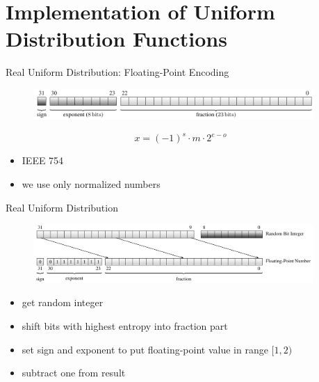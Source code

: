 \documentclass[aspectratio=169]{beamer}
\begin{document}
    \section{Implementation of Uniform Distribution Functions}
    \begin{frame}{Real Uniform Distribution: Floating-Point Encoding}
      \begin{figure}
        \includegraphics[width=0.95\textwidth]{figures/floating-point_encoding_single.pdf}
      \end{figure}
      \begin{mybox}
        \[
          x = (-1)^s \cdot m \cdot 2^{e - o}
        \]
      \end{mybox}
      \begin{itemize}
        \item IEEE 754
        \item we use only normalized numbers
      \end{itemize}
    \end{frame}

    \begin{frame}{Real Uniform Distribution}
      \begin{figure}
        \includegraphics[width=0.95\textwidth]{figures/uniform_implementation_scheme.pdf}
      \end{figure}
      \begin{itemize}
        \pause
        \item get random integer
        \pause
        \item shift bits with highest entropy into fraction part
        \pause
        \item set sign and exponent to put floating-point value in range $[1,2)$
        \pause
        \item subtract one from result
      \end{itemize}
    \end{frame}
\end{document}
